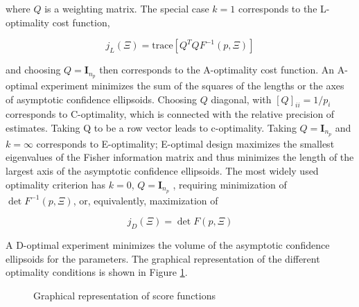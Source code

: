 \documentclass[]{scrartcl}
\begin{document}
where $Q$ is a weighting matrix. The special case $k = 1$ corresponds to the L-optimality cost function,

\begin{equation}
	j_L(\Xi) = \text{trace} \left[ Q^TQF^{-1}(p,\Xi) \right]
\end{equation}

and choosing $Q = \textbf{I}_{n_p}$ then corresponds to the A-optimality cost function. An A-optimal experiment minimizes the sum of the squares of the lengths or the axes of asymptotic confidence ellipsoids. Choosing $Q$ diagonal, with $[Q]_{ii} = 1/p_i$ corresponds to C-optimality, which is connected with the relative precision of estimates. Taking Q to be a row vector leads to c-optimality. Taking $Q = \textbf{I}_{n_p}$ and $k = \infty$ corresponds to E-optimality; E-optimal design maximizes the smallest eigenvalues of the Fisher information matrix and thus minimizes the length of the largest axis of the asymptotic confidence ellipsoids. The most widely used optimality criterion has $k = 0$, $Q = \textbf{I}_{n_p}$ , requiring minimization of $\det F^{-1}(p, \Xi)$, or, equivalently, maximization of

\begin{equation}
	j_D(\Xi) = \det F(p, \Xi)
\end{equation}

A D-optimal experiment minimizes the volume of the asymptotic confidence ellipsoids for the parameters. The graphical representation of the different optimality conditions is shown in Figure \ref{fig:score_fun}.

\begin{figure}[!h]
	\centering
	\caption{Graphical representation of score functions}
	\label{fig:score_fun}
\end{figure}
\end{document}
